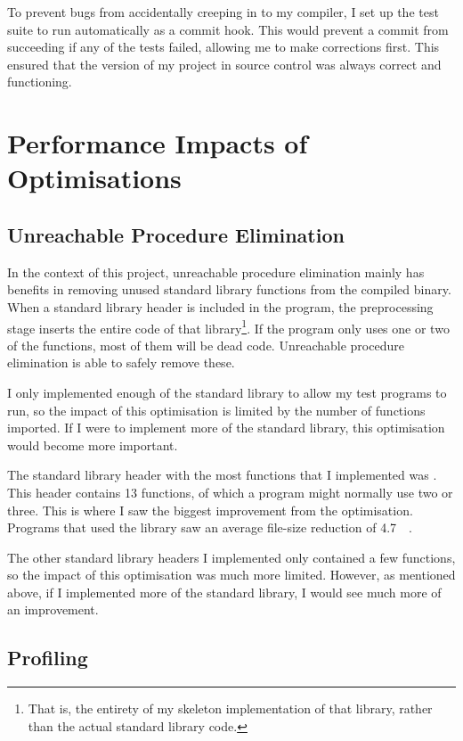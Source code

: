 \documentclass[00-main.tex]{subfiles}
\begin{document}
To prevent bugs from accidentally creeping in to my compiler, I set up the test suite to run automatically as a commit hook. This would prevent a commit from succeeding if any of the tests failed, allowing me to make corrections first.
This ensured that the version of my project in source control was always correct and functioning.




\section{Performance Impacts of Optimisations}

\subsection{Unreachable Procedure Elimination}


In the context of this project, unreachable procedure elimination mainly has benefits in removing unused standard library functions from the compiled binary.
When a standard library header is included in the program, the preprocessing stage inserts the entire code of that library\footnote{That is, the entirety of my skeleton implementation of that library, rather than the actual standard library code.}.
If the program only uses one or two of the functions, most of them will be dead code.
Unreachable procedure elimination is able to safely remove these.

I only implemented enough of the standard library to allow my test programs to run, so the impact of this optimisation is limited by the number of functions imported.
If I were to implement more of the standard library, this optimisation would become more important.

The standard library header with the most functions that I implemented was .
This header contains 13 functions, of which a program might normally use two or three.
This is where I saw the biggest improvement from the optimisation.
Programs that used the  library saw an average file-size reduction of \SI{4.7}{\kilo\byte}.

The other standard library headers I implemented only contained a few functions, so the impact of this optimisation was much more limited. However, as mentioned above, if I implemented more of the standard library, I would see much more of an improvement.

\subsection{Profiling}
\end{document}
